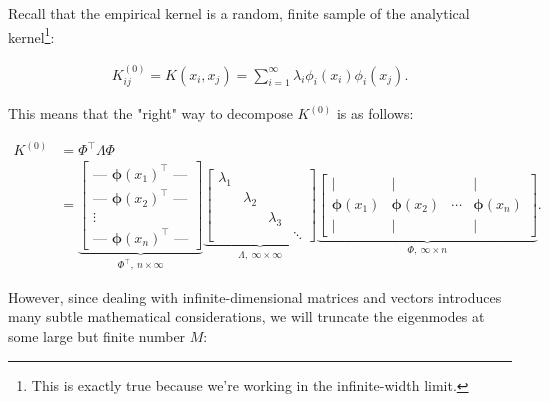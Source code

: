 
Recall that the empirical kernel is a random, finite sample of the analytical kernel\footnote{This is exactly true because we're working in the infinite-width limit.}:

\begin{align}
K^{(0)}_{ij} = K(x_i,x_j) = \sum^{\infty}_{i=1} \lambda_i \phi_i(x_i) \phi_i(x_j).
\end{align}

This means that the "right" way to decompose $K^{(0)}$ is as follows:

\begin{align}
K^{(0)} &= \Phi^\top \Lambda\Phi
\\&= 
\underbrace{
\begin{bmatrix}
\text{--- } \boldsymbol\phi(x_1)^\top \text{ ---} \\
\text{--- } \boldsymbol\phi(x_2)^\top \text{ ---} \\
\vdots \\
\text{--- } \boldsymbol\phi(x_n)^\top \text{ ---}
\end{bmatrix}
}_{\Phi^\top,\ n\times\infty}
\underbrace{
\begin{bmatrix}
\lambda_1 & & & \\
& \lambda_2 & & \\
& & \lambda_3 & \\
& & & \ddots
\end{bmatrix}
}_{\Lambda,\ \infty\times\infty}
\underbrace{
\begin{bmatrix}
| & | & & | \\
\boldsymbol\phi(x_1) & \boldsymbol\phi(x_2) & \cdots & \boldsymbol\phi(x_n) \\
| & | & & |
\end{bmatrix}
}_{\Phi,\ \infty\times n}.
\end{align}

However, since dealing with infinite-dimensional matrices and vectors introduces many subtle mathematical considerations, we will truncate the eigenmodes at some large but finite number $M$:

